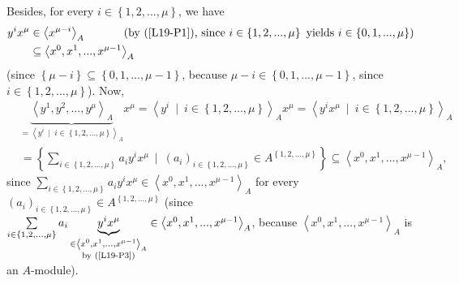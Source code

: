 \documentclass[12pt,final,notitlepage,onecolumn]{article}%
\begin{document}
Besides, for every $i\in\left\{  1,2,...,\mu\right\}  $, we have%
\begin{align}
y^{i}x^{\mu}  &  \in\left\langle x^{\mu-i}\right\rangle _{A}%
\ \ \ \ \ \ \ \ \ \ \left(  \text{by (\ref{L19-P1}), since }i\in\left\{
1,2,...,\mu\right\}  \text{ yields }i\in\left\{  0,1,...,\mu\right\}  \right)
\nonumber\\
&  \subseteq\left\langle x^{0},x^{1},...,x^{\mu-1}\right\rangle _{A}
\label{L19-P3}%
\end{align}
(since $\left\{  \mu-i\right\}  \subseteq\left\{  0,1,...,\mu-1\right\}  $,
because $\mu-i\in\left\{  0,1,...,\mu-1\right\}  $, since $i\in\left\{
1,2,...,\mu\right\}  $). Now,%
\begin{align}
&  \underbrace{\left\langle y^{1},y^{2},...,y^{\mu}\right\rangle _{A}%
}_{=\left\langle y^{i}\ \mid\ i\in\left\{  1,2,...,\mu\right\}  \right\rangle
_{A}}x^{\mu}=\left\langle y^{i}\ \mid\ i\in\left\{  1,2,...,\mu\right\}
\right\rangle _{A}x^{\mu}=\left\langle y^{i}x^{\mu}\ \mid\ i\in\left\{
1,2,...,\mu\right\}  \right\rangle _{A}\nonumber\\
&  =\left\{  \sum\limits_{i\in\left\{  1,2,...,\mu\right\}  }a_{i}y^{i}x^{\mu
}\ \mid\ \left(  a_{i}\right)  _{i\in\left\{  1,2,...,\mu\right\}  }\in
A^{\left\{  1,2,...,\mu\right\}  }\right\}  \subseteq\left\langle x^{0}%
,x^{1},...,x^{\mu-1}\right\rangle _{A}, \label{L19-Pb}%
\end{align}
since $\sum\limits_{i\in\left\{  1,2,...,\mu\right\}  }a_{i}y^{i}x^{\mu}%
\in\left\langle x^{0},x^{1},...,x^{\mu-1}\right\rangle _{A}$ for every
$\left(  a_{i}\right)  _{i\in\left\{  1,2,...,\mu\right\}  }\in A^{\left\{
1,2,...,\mu\right\}  }$ (since $\sum\limits_{i\in\left\{  1,2,...,\mu\right\}
}a_{i}\underbrace{y^{i}x^{\mu}}_{\substack{\in\left\langle x^{0}%
,x^{1},...,x^{\mu-1}\right\rangle _{A}\\\text{by (\ref{L19-P3})}}%
}\in\left\langle x^{0},x^{1},...,x^{\mu-1}\right\rangle _{A}$, because
$\left\langle x^{0},x^{1},...,x^{\mu-1}\right\rangle _{A}$ is an $A$-module).
\end{document}
